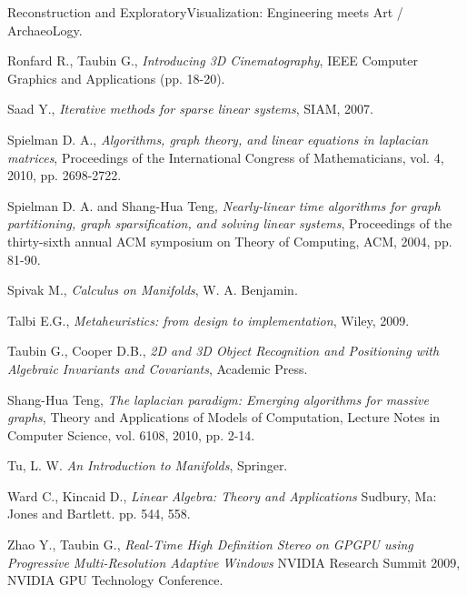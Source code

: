 \documentclass[conference,compsoc,a4paper]{IEEEtran}
\begin{document}
\begin{thebibliography}{1}
\newblock Reconstruction and ExploratoryVisualization: Engineering 
meets Art / ArchaeoLogy.

Ronfard R., Taubin G., 
\newblock \textit{Introducing 3D Cinematography}, 
\newblock IEEE Computer Graphics and Applications (pp. 18-20).

Saad Y., 
\newblock \textit{Iterative methods for sparse linear systems}, 
\newblock SIAM, 2007.

Spielman D. A.,
\newblock \textit{Algorithms, graph theory, and linear equations in laplacian 
matrices}, 
\newblock Proceedings of the International Congress of Mathematicians, vol. 4, 
2010, pp. 2698-2722.

Spielman D. A. and Shang-Hua Teng,
\newblock \textit{Nearly-linear time algorithms for graph partitioning, graph 
sparsification, and solving linear systems}, 
\newblock Proceedings of the thirty-sixth annual ACM symposium on Theory of 
Computing, ACM, 2004, pp. 81-90.

Spivak M.,
\newblock \textit{Calculus on Manifolds},
\newblock W. A. Benjamin.

Talbi E.G., 
\newblock \textit{Metaheuristics: from design to implementation}, 
\newblock Wiley, 2009.

Taubin G., Cooper D.B., 
\newblock \textit{2D and 3D Object Recognition and Positioning with 
Algebraic Invariants and Covariants}, 
\newblock Academic Press.

Shang-Hua Teng,
\newblock \textit{The laplacian paradigm: Emerging algorithms for massive 
graphs}, 
\newblock Theory and Applications of Models of Computation, Lecture Notes in 
Computer Science, vol. 6108, 2010, pp. 2-14.

Tu, L. W. 
\newblock \textit{An Introduction to Manifolds},
\newblock Springer.

Ward C., Kincaid D., 
\newblock \textit{Linear Algebra: Theory and Applications}
\newblock Sudbury, Ma: Jones and Bartlett. pp. 544, 558.

Zhao Y., Taubin G., 
\newblock \textit{Real-Time High Definition Stereo on GPGPU using 
Progressive Multi-Resolution Adaptive Windows}
\newblock NVIDIA Research Summit 2009, NVIDIA GPU Technology Conference.

\end{thebibliography}

\end{document}
